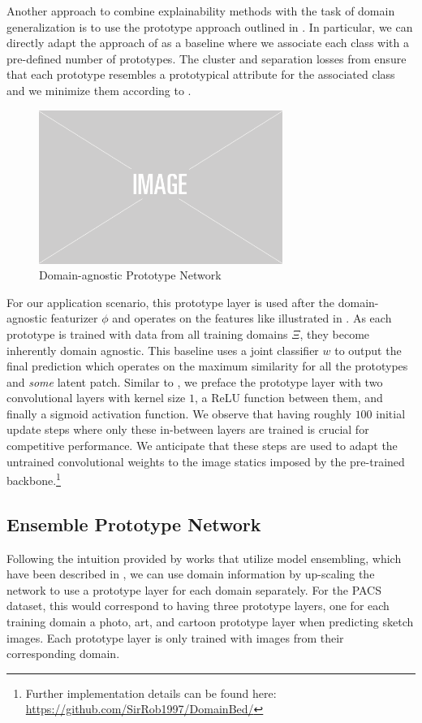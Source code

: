 Another approach to combine explainability methods with the task of domain generalization is to use the prototype approach outlined in . In particular, we can directly adapt the approach of \citet{ChenLTBRS19} as a baseline where we associate each class with a pre-defined number of prototypes. The cluster and separation losses from  ensure that each prototype resembles a prototypical attribute for the associated class and we minimize them according to .

\begin{figure}[t]
    \centering
    \includegraphics[width=\textwidth, height=5cm]{Figures/img-placeholder.png}
    \caption{Domain-agnostic Prototype Network}
    \label{fig:domain_prototype_network}
\end{figure}

For our application scenario, this prototype layer is used after the domain-agnostic featurizer $\phi$ and operates on the features like illustrated in . As each prototype is trained with data from all training domains $\Xi$, they become inherently domain agnostic. This baseline uses a joint classifier $w$ to output the final prediction which operates on the maximum similarity for all the prototypes and \emph{some} latent patch. Similar to \citet{ChenLTBRS19}, we preface the prototype layer with two convolutional layers with kernel size $1$, a ReLU function between them, and finally a sigmoid activation function. We observe that having roughly $100$ initial update steps where only these in-between layers are trained is crucial for competitive performance. We anticipate that these steps are used to adapt the untrained convolutional weights to the image statics imposed by the pre-trained backbone.\footnote{Further implementation details can be found here: \url{https://github.com/SirRob1997/DomainBed/}}


\subsection{Ensemble Prototype Network}
Following the intuition provided by works that utilize model ensembling, which have been described in , we can use domain information by up-scaling the network to use a prototype layer for each domain separately. For the PACS dataset, this would correspond to having three prototype layers, one for each training domain \eg a photo, art, and cartoon prototype layer when predicting sketch images. Each prototype layer is only trained with images from their corresponding domain.

